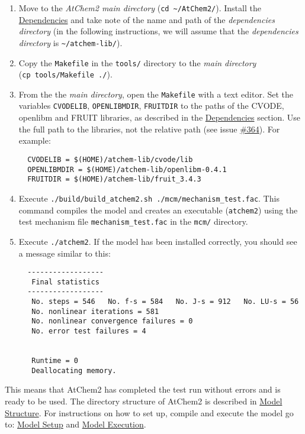 \begin{enumerate}
\item Move to the \emph{AtChem2 main directory} (\texttt{cd\
    \textasciitilde{}/AtChem2/}). Install the
  \hyperref[sec:dependencies]{Dependencies} and take note of the name
  and path of the \emph{dependencies directory} (in the following
  instructions, we will assume that the \emph{dependencies directory}
  is \texttt{\textasciitilde{}/atchem-lib/}).
\item Copy the \texttt{Makefile} in the \texttt{tools/} directory to
  the \emph{main directory} (\texttt{cp\ tools/Makefile\ ./}).
\item From the the \emph{main directory}, open the \texttt{Makefile}
  with a text editor. Set the variables \texttt{CVODELIB},
  \texttt{OPENLIBMDIR}, \texttt{FRUITDIR} to the paths of the CVODE,
  openlibm and FRUIT libraries, as described in the
  \hyperref[sec:dependencies]{Dependencies} section. Use the full path
  to the libraries, not the relative path (see issue
  \href{https://github.com/AtChem/AtChem2/issues/364}{\#364}). For
  example:
  \begin{verbatim}
  CVODELIB = $(HOME)/atchem-lib/cvode/lib
  OPENLIBMDIR = $(HOME)/atchem-lib/openlibm-0.4.1
  FRUITDIR = $(HOME)/atchem-lib/fruit_3.4.3
  \end{verbatim}
\item Execute \texttt{./build/build\_atchem2.sh\
    ./mcm/mechanism\_test.fac}. This command compiles the model and
  creates an executable (\texttt{atchem2}) using the test mechanism
  file \texttt{mechanism\_test.fac} in the \texttt{mcm/} directory.
\item Execute \texttt{./atchem2}. If the model has been installed
  correctly, you should see a message similar to this:
  \begin{verbatim}
  ------------------
   Final statistics
  ------------------
   No. steps = 546   No. f-s = 584   No. J-s = 912   No. LU-s = 56
   No. nonlinear iterations = 581
   No. nonlinear convergence failures = 0
   No. error test failures = 4


   Runtime = 0
   Deallocating memory.
  \end{verbatim}
\end{enumerate}

This means that AtChem2 has completed the test run without errors and
is ready to be used. The directory structure of AtChem2 is described
in \hyperref[sec:structure]{Model Structure}. For instructions on how
to set up, compile and execute the model go to:
\hyperref[ch:setup]{Model Setup} and \hyperref[ch:execution]{Model
  Execution}.

